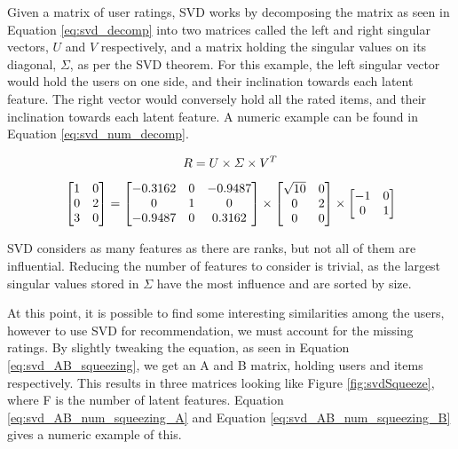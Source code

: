 Given a matrix of user ratings, SVD works by decomposing the matrix as seen in Equation \ref{eq:svd_decomp} into two matrices called the left and right singular vectors, $U$ and $V$ respectively, and a matrix holding the singular values on its diagonal, $\Sigma$, as per the SVD theorem\cite{svdtheorem}. For this example, the left singular vector would hold the users on one side, and their inclination towards each latent feature. The right vector would conversely hold all the rated items, and their inclination towards each latent feature\cite{linearalgebra_svd}\cite{recsys_svd}. A numeric example can be found in Equation \ref{eq:svd_num_decomp}.

\begin{equation} \label{eq:svd_decomp}
\centering
R = U\times \Sigma \times V^T
\end{equation}

\begin{equation}\label{eq:svd_num_decomp}
\centering
\begin{bmatrix}
1 & 0\\ 
0 & 2\\ 
3 & 0
\end{bmatrix} = 
\begin{bmatrix}
-0.3162 & 0 & -0.9487\\ 
0 & 1 & 0\\ 
-0.9487 & 0 & 0.3162
\end{bmatrix} \times 
\begin{bmatrix}
\sqrt{10} & 0\\ 
0 & 2\\ 
0 & 0
\end{bmatrix} \times
\begin{bmatrix}
-1 & 0\\ 
0 & 1
\end{bmatrix}
\end{equation}

SVD considers as many features as there are ranks, but not all of them are influential. Reducing the number of features to consider is trivial, as the largest singular values stored in $\Sigma$ have the most influence and are sorted by size.

At this point, it is possible to find some interesting similarities among the users, however to use SVD for recommendation, we must account for the missing ratings. By slightly tweaking the equation, as seen in Equation \ref{eq:svd_AB_squeezing}, we get an A and B matrix, holding users and items respectively. This results in three matrices looking like Figure \ref{fig:svdSqueeze}, where F is the number of latent features. Equation \ref{eq:svd_AB_num_squeezing_A} and Equation \ref{eq:svd_AB_num_squeezing_B} gives a numeric example of this.

